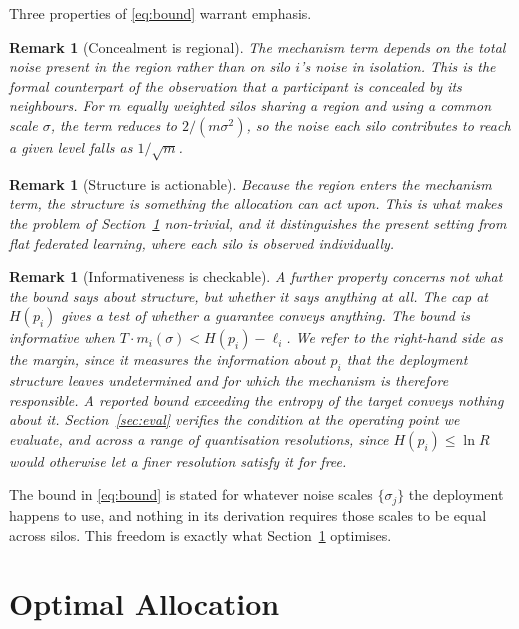 \documentclass[acmsmall,screen,review,anonymous]{acmart}
\theoremstyle{acmdefinition}%
\newtheorem{remark}[theorem]{Remark}%
\begin{document}
Three properties of \eqref{eq:bound} warrant emphasis.

\begin{remark}[Concealment is regional]
\label{rem:regional}
The mechanism term depends on the total noise present in the region rather than on
silo $i$'s noise in isolation. This is the formal counterpart of the observation
that a participant is concealed by its neighbours. For $m$ equally weighted silos
sharing a region and using a common scale $\sigma$, the term reduces to $2/(m
\sigma^2)$, so the noise each silo contributes to reach a given level falls as
$1/\sqrt{m}$.
\end{remark}

\begin{remark}[Structure is actionable]
Because the region enters the mechanism term, the structure is something the
allocation can act upon. This is what makes the problem of
Section~\ref{sec:allocation} non-trivial, and it distinguishes the present setting
from flat federated learning, where each silo is observed individually.
\end{remark}

\begin{remark}[Informativeness is checkable]
\label{rem:informative}
A further property concerns not what the bound says about structure, but whether
it says anything at all. The cap at $H(p_i)$ gives a test of whether a guarantee
conveys anything. The bound is informative when $T \cdot m_i(\sigma) < H(p_i) -
\ell_i$. We refer to the right-hand side as the margin, since it measures the
information about $p_i$ that the deployment structure leaves undetermined and for
which the mechanism is therefore responsible. A reported bound exceeding the
entropy of the target conveys nothing about it. Section~\ref{sec:eval} verifies the
condition at the operating point we evaluate, and across a range of quantisation
resolutions, since $H(p_i) \le \ln R$ would otherwise let a finer resolution
satisfy it for free.
\end{remark}

The bound in \eqref{eq:bound} is stated for whatever noise scales $\{\sigma_j\}$
the deployment happens to use, and nothing in its derivation requires those scales
to be equal across silos. This freedom is exactly what Section~\ref{sec:allocation}
optimises.

\section{Optimal Allocation}
\label{sec:allocation}
\end{document}
